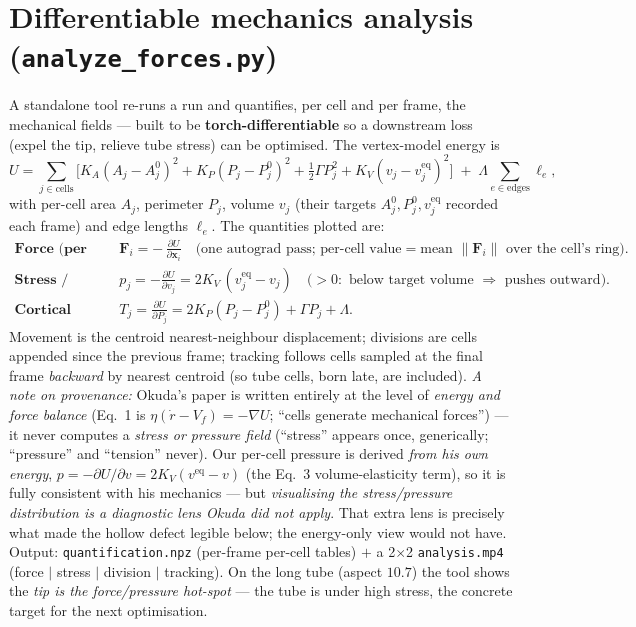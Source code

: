 \documentclass[11pt]{article}
\begin{document}
\section{Differentiable mechanics analysis (\texttt{analyze\_forces.py})}
A standalone tool re-runs a run and quantifies, per cell and per frame, the mechanical fields --- built to be
\textbf{torch-differentiable} so a downstream loss (expel the tip, relieve tube stress) can be optimised.
The vertex-model energy is
\begin{equation}
U=\sum_{j\in\text{cells}}\Big[K_A(A_j-A_j^0)^2+K_P(P_j-P_j^0)^2+\tfrac12\Gamma P_j^2+K_V(v_j-v_j^{\text{eq}})^2\Big]
  \;+\;\Lambda\!\!\sum_{e\in\text{edges}}\!\ell_e,
\end{equation}
with per-cell area $A_j$, perimeter $P_j$, volume $v_j$ (their targets $A_j^0,P_j^0,v_j^{\text{eq}}$ recorded
each frame) and edge lengths $\ell_e$. The quantities plotted are:
\begin{align}
\textbf{Force (per vertex):}\quad & \mathbf{F}_i=-\,\frac{\partial U}{\partial \mathbf{x}_i}
  \quad\text{(one autograd pass; per-cell value} = \text{mean } \|\mathbf{F}_i\|\text{ over the cell's ring).}\\
\textbf{Stress / pressure (per cell):}\quad & p_j=-\frac{\partial U}{\partial v_j}=2K_V\,(v_j^{\text{eq}}-v_j)
  \quad\text{(}{>}0:\text{ below target volume }\Rightarrow\text{ pushes outward).}\\
\textbf{Cortical tension (per cell):}\quad & T_j=\frac{\partial U}{\partial P_j}=2K_P(P_j-P_j^0)+\Gamma P_j+\Lambda .
\end{align}
Movement is the centroid nearest-neighbour displacement; divisions are cells appended since the previous
frame; tracking follows cells sampled at the final frame \emph{backward} by nearest centroid (so tube cells,
born late, are included). \emph{A note on provenance:} Okuda's paper is written entirely at the level of
\emph{energy and force balance} (Eq.~1 is $\eta(\dot r-V_f)=-\nabla U$; ``cells generate mechanical forces'')
--- it never computes a \emph{stress or pressure field} (``stress'' appears once, generically; ``pressure''
and ``tension'' never). Our per-cell pressure is derived \emph{from his own energy}, $p=-\partial U/\partial
v=2K_V(v^{\text{eq}}-v)$ (the Eq.~3 volume-elasticity term), so it is fully consistent with his mechanics ---
but \emph{visualising the stress/pressure distribution is a diagnostic lens Okuda did not apply}. That extra
lens is precisely what made the hollow defect legible below; the energy-only view would not have. Output: \texttt{quantification.npz} (per-frame per-cell tables) $+$ a 2$\times$2
\texttt{analysis.mp4} (force $\mid$ stress $\mid$ division $\mid$ tracking). On the long tube (aspect $10.7$)
the tool shows the \emph{tip is the force/pressure hot-spot} --- the tube is under high stress, the concrete
target for the next optimisation.
\end{document}
